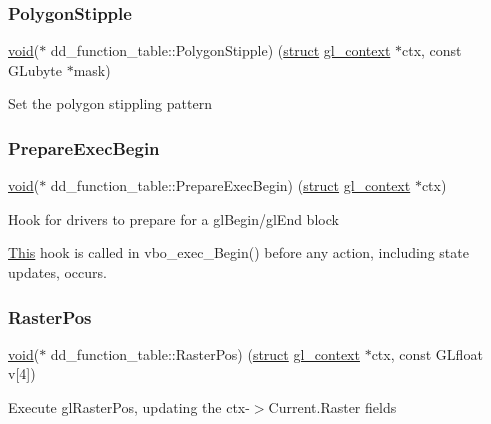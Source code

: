 \subsubsection{\texorpdfstring{Polygon\+Stipple}{PolygonStipple}}
{\footnotesize\ttfamily \hyperlink{interfacevoid}{void}($\ast$ dd\+\_\+function\+\_\+table\+::\+Polygon\+Stipple) (\hyperlink{interfacestruct}{struct} \hyperlink{structgl__context}{gl\+\_\+context} $\ast$ctx, const G\+Lubyte $\ast$mask)}

Set the polygon stippling pattern \mbox{\label{structdd__function__table_aca0984d93fad489005dd371c904f21de}} 
\subsubsection{\texorpdfstring{Prepare\+Exec\+Begin}{PrepareExecBegin}}
{\footnotesize\ttfamily \hyperlink{interfacevoid}{void}($\ast$ dd\+\_\+function\+\_\+table\+::\+Prepare\+Exec\+Begin) (\hyperlink{interfacestruct}{struct} \hyperlink{structgl__context}{gl\+\_\+context} $\ast$ctx)}



Hook for drivers to prepare for a gl\+Begin/gl\+End block 

\hyperlink{namespace_this}{This} hook is called in vbo\+\_\+exec\+\_\+\+Begin() before any action, including state updates, occurs. \mbox{\label{structdd__function__table_ac39afdd3daf3f75b50295df734241d86}} 
\subsubsection{\texorpdfstring{Raster\+Pos}{RasterPos}}
{\footnotesize\ttfamily \hyperlink{interfacevoid}{void}($\ast$ dd\+\_\+function\+\_\+table\+::\+Raster\+Pos) (\hyperlink{interfacestruct}{struct} \hyperlink{structgl__context}{gl\+\_\+context} $\ast$ctx, const G\+Lfloat v\mbox{[}4\mbox{]})}

Execute gl\+Raster\+Pos, updating the ctx-\/$>$Current.\+Raster fields \mbox{\label{structdd__function__table_a2327fc5203c524e7db433dbdbbdb644f}} 
